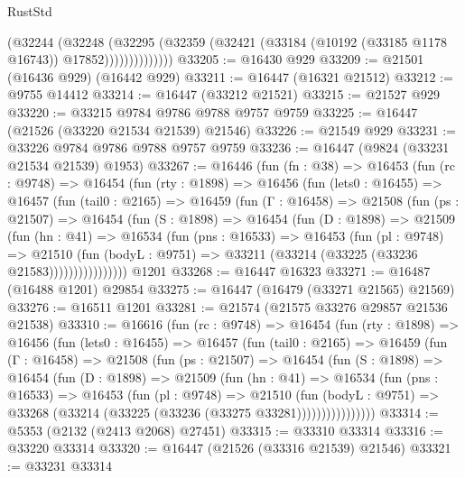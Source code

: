 \begin{lexlean}{RustStd}
\begin{coremodule}
                    (@32244
                      (@32248
                        (@32295
                          (@32359
                            (@32421 (@33184 (@10192 (@33185 @1178 @16743)) @17852))))))))))))))
@33205 := @16430 @929
@33209 := @21501 (@16436 @929) (@16442 @929)
@33211 := @16447 (@16321 @21512)
@33212 := @9755 @14412
@33214 := @16447 (@33212 @21521)
@33215 := @21527 @929
@33220 := @33215 @9784 @9786 @9788 @9757 @9759
@33225 := @16447 (@21526 (@33220 @21534 @21539) @21546)
@33226 := @21549 @929
@33231 := @33226 @9784 @9786 @9788 @9757 @9759
@33236 := @16447 (@9824 (@33231 @21534 @21539) @1953)
@33267 := @16446
    (fun (fn : @38) =>
    @16453
      (fun (rc : @9748) =>
      @16454
        (fun (rty : @1898) =>
        @16456
          (fun (lets0 : @16455) =>
          @16457
            (fun (tail0 : @2165) =>
            @16459
              (fun (Γ : @16458) =>
              @21508
                (fun (ps : @21507) =>
                @16454
                  (fun (S : @1898) =>
                  @16454
                    (fun (D : @1898) =>
                    @21509
                      (fun (hn : @41) =>
                      @16534
                        (fun (pns : @16533) =>
                        @16453
                          (fun (pl : @9748) =>
                          @21510
                            (fun (bodyL : @9751) =>
                            @33211 (@33214 (@33225 (@33236 @21583))))))))))))))))
    @1201
@33268 := @16447 @16323
@33271 := @16487 (@16488 @1201) @29854
@33275 := @16447 (@16479 (@33271 @21565) @21569)
@33276 := @16511 @1201
@33281 := @21574 (@21575 @33276 @29857 @21536 @21538)
@33310 := @16616
    (fun (rc : @9748) =>
    @16454
      (fun (rty : @1898) =>
      @16456
        (fun (lets0 : @16455) =>
        @16457
          (fun (tail0 : @2165) =>
          @16459
            (fun (Γ : @16458) =>
            @21508
              (fun (ps : @21507) =>
              @16454
                (fun (S : @1898) =>
                @16454
                  (fun (D : @1898) =>
                  @21509
                    (fun (hn : @41) =>
                    @16534
                      (fun (pns : @16533) =>
                      @16453
                        (fun (pl : @9748) =>
                        @21510
                          (fun (bodyL : @9751) =>
                          @33268 (@33214 (@33225 (@33236 (@33275 @33281))))))))))))))))
@33314 := @5353 (@2132 (@2413 @2068) @27451)
@33315 := @33310 @33314
@33316 := @33220 @33314
@33320 := @16447 (@21526 (@33316 @21539) @21546)
@33321 := @33231 @33314

\end{coremodule}
\end{lexlean}
